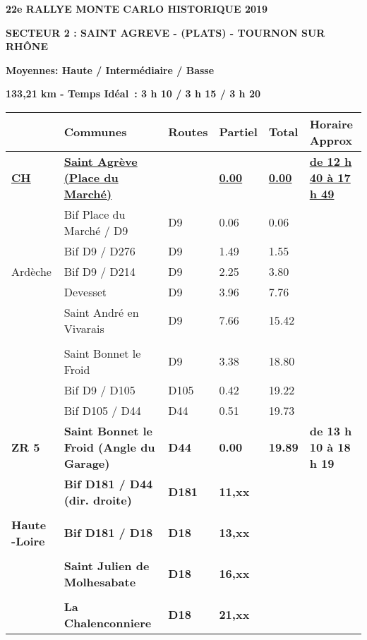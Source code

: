 \documentclass{article}%
\begin{document}
%
\normalsize%
\begin{center} \textbf{\LARGE{22e RALLYE MONTE CARLO HISTORIQUE 2019}} \end{center}%
\begin{flushleft} \textbf{SECTEUR 2 : SAINT AGREVE - (PLATS) - TOURNON SUR RHÔNE
} \end{flushleft}%
\begin{flushright} \textbf{             Moyennes: Haute / Intermédiaire / Basse
} \end{flushright}%
\begin{flushright} \textbf{133,21 km - Temps Idéal : 3 h 10 / 3 h 15 / 3 h 20
} \end{flushright}%
\begin{longtable}{p{2.25cm}|p{6.7cm}|p{2.0cm}|p{1.5cm}|p{1.5cm}|p{3.5cm}}%
\hline%
&Communes&Routes&Partiel&Total&Horaire Approx\\%
\hline%
\endhead%
\endfoot%
\endlastfoot%
\textbf{\underline{﻿CH}}&\textbf{\underline{Saint Agrève (Place du Marché)}}& &\textbf{\underline{0.00}}&\textbf{\underline{0.00}}&\textbf{\underline{de 12 h 40 à 17 h 49}}\\%
 &Bif Place du Marché / D9&D9&0.06&0.06& \\%
 &Bif D9 / D276&D9&1.49&1.55& \\%
Ardèche&Bif D9 / D214&D9&2.25&3.80& \\%
 &Devesset&D9&3.96&7.76& \\%
 &Saint André en Vivarais&D9&7.66&15.42& \\%
\hline& & & & & \\%
 &Saint Bonnet le Froid&D9&3.38&18.80& \\%
 &Bif D9 / D105&D105&0.42&19.22& \\%
 &Bif D105 / D44&D44&0.51&19.73& \\%
\textbf{ZR 5}&\textbf{Saint Bonnet le Froid  (Angle du Garage) }&\textbf{D44 }&\textbf{0.00}&\textbf{19.89}&\textbf{de 13 h 10 à 18 h 19}\\%
 &\textbf{Bif D181 / D44 (dir. droite)}&\textbf{D181}&\textbf{11,xx}& & \\%
 & & & & & \\%
\textbf{Haute -Loire}&\textbf{Bif D181 / D18}&\textbf{D18}&\textbf{13,xx}& & \\%
 & & & & & \\%
 &\textbf{Saint Julien de Molhesabate }&\textbf{D18}&\textbf{16,xx}& & \\%
 & & & & & \\%
 &\textbf{La Chalenconniere}&\textbf{D18 }&\textbf{21,xx}& & \\%

\end{longtable}
\end{document}
